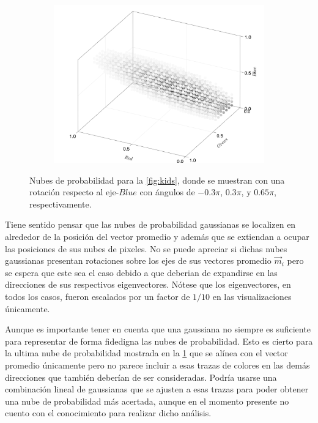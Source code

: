 \begin{figure}[ht!]
\begin{subfigure}[c]{0.3\textwidth}
        \includegraphics[scale=0.09]{../figures/gaussian_cloud_kids_3}
    \end{subfigure}
    \caption{Nubes de probabilidad para la \cref{fig:kids}, donde se muestran con una rotación respecto al eje-$Blue$ con ángulos de $-0.3\pi$, $0.3\pi$, y $0.65\pi$, respectivamente.}
    \label{fig:nube-gaussiana-kids}
\end{figure}

Tiene sentido pensar que las nubes de probabilidad gaussianas se localizen en alrededor de la posición del vector promedio y además que se extiendan a ocupar las posiciones de sus nubes de pixeles. No se puede apreciar si dichas nubes gaussianas presentan rotaciones sobre los ejes de sus vectores promedio $\vec{m}_i$ pero se espera que este sea el caso debido a que deberian de expandirse en las direcciones de sus respectivos eigenvectores. Nótese que los eigenvectores, en todos los casos, fueron escalados por un factor de $1/10$ en las visualizaciones únicamente.

Aunque es importante tener en cuenta que una gaussiana no siempre es suficiente para representar de forma fidedigna las nubes de probabilidad. Esto es cierto para la ultima nube de probabilidad mostrada en la \cref{fig:nube-gaussiana-kids} que se alínea con el vector promedio únicamente pero no parece incluir a esas trazas de colores en las demás direcciones que también deberían de ser consideradas. Podría usarse una combinación lineal de gaussianas que se ajusten a esas trazas para poder obtener una nube de probabilidad más acertada, aunque en el momento presente no cuento con el conocimiento para realizar dicho análisis.

